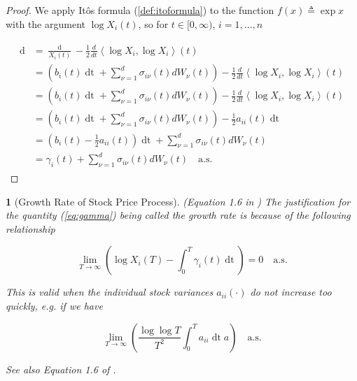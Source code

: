 \documentclass[british]{amsart}
\numberwithin{equation}{section}
\numberwithin{figure}{section}
\theoremstyle{plain}
\newtheorem{thm}{\protect\theoremname}[section]
\theoremstyle{definition}
\theoremstyle{plain}
\theoremstyle{plain}
\theoremstyle{plain}
\theoremstyle{remark}
\theoremstyle{plain}
\providecommand{\theoremname}{Theorem}
\renewcommand{\d}[1]{\mathop{\mathrm{d}{#1}}}
\newcommand{\ranget}{t\in[0,\infty)}
\newcommand{\defeq}{\mathop{\triangleq}}
\newcommand{\almostsurely}{\text{a.s.}}
\newcommand{\rangei}{i=1,\dots,n}
\begin{document}
\begin{proof}

	We apply It\^{o}s formula (\ref{def:itoformula}) to the function $f(x)\defeq\exp{x}$ with the argument $\log{X_{i}(t)}$, so for $\ranget$, $\rangei$

	\begin{gather*}
		\begin{split}
			\d{\log{X_{i}(t)}} 
			 	& = 
					\frac{\d{X_{i}(t)}}{X_{i}(t)} - 
						\frac{1}{2} \frac{d}{dt}\left\langle \log X_{i},\log X_{i}\right\rangle(t)
					\\
				& = 
					\left(
						b_{i}(t)\d{t} + 
						\sum_{\nu=1}^{d} \sigma_{i\nu}(t) dW_{\nu}(t)
					\right)- 
					\frac{1}{2} \frac{d}{dt}\left\langle \log X_{i},\log X_{i}\right\rangle(t)
					\\
				& = 
					\left(
						b_{i}(t)\d{t} + 
						\sum_{\nu=1}^{d} \sigma_{i\nu}(t) dW_{\nu}(t)
					\right)- 
					\frac{1}{2} \frac{d}{dt}\left\langle \log X_{i},\log X_{i}\right\rangle(t)
					\\
				& = 
					\left(
						b_{i}(t)\d{t} + 
						\sum_{\nu=1}^{d} \sigma_{i\nu}(t) dW_{\nu}(t)
					\right)- 
					\frac{1}{2} a_{ii}(t)\d{t}
					\\
				& = 
					\left(
						b_{i}(t) -
						\frac{1}{2} a_{ii}(t)
					\right) \d{t} +
					\sum_{\nu=1}^{d} \sigma_{i\nu}(t) dW_{\nu}(t)
					\\
				& = 
					\gamma_{i}(t) +
					\sum_{\nu=1}^{d} \sigma_{i\nu}(t) dW_{\nu}(t)
				\quad \almostsurely
		\end{split}
	\end{gather*}

\end{proof}

\begin{thm} [Growth Rate of Stock Price Process]
	\label{thm:growthrate}
	(Equation 1.6 in \cite{fernholz2009})
	The justification for the quantity (\ref{eq:gamma}) being called the 
	\textit{growth rate} is	because of the following relationship

	\begin{equation}
		\lim_{T \to \infty} 
			\left( 
			\log{X_{i}(T)} - \int_{0}^{T} \gamma_{i}(t)\d{t} 
			\right) = 0
		\quad \almostsurely
	\end{equation}

	This is valid when the individual stock variances $a_{ii}(\cdot)$ do not increase too quickly, e.g. if we have 


	\begin{equation*}
		\lim_{T\to\infty} \left( \frac{\log \log T}{T^2} \int_{0}^{T} a_{ii} \d{t}a \right)
		\quad \almostsurely 
	\end{equation*}

	See also Equation 1.6 of \cite{fernholz2009}.

\end{thm}
\end{document}

